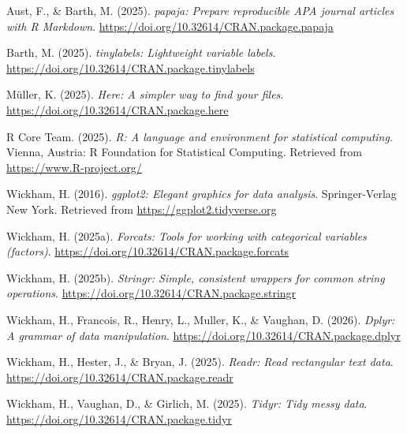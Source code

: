 \documentclass[
  english,
  man]{apa6}
\newlength{\cslhangindent}
\newenvironment{CSLReferences}[2] %
 {\begin{list}{}{%
  \setlength{\itemindent}{0pt}
  \setlength{\leftmargin}{0pt}
  \setlength{\parsep}{0pt}
  \ifodd #1
   \setlength{\leftmargin}{\cslhangindent}
   \setlength{\itemindent}{-1\cslhangindent}
  \fi
  \setlength{\itemsep}{#2\baselineskip}}}
 {\end{list}}
\begin{document}
\label{refs}
\begin{CSLReferences}{1}{0}
Aust, F., \& Barth, M. (2025). \emph{{papaja}: {Prepare} reproducible {APA} journal articles with {R Markdown}}. \url{https://doi.org/10.32614/CRAN.package.papaja}

Barth, M. (2025). \emph{{tinylabels}: Lightweight variable labels}. \url{https://doi.org/10.32614/CRAN.package.tinylabels}

Müller, K. (2025). \emph{Here: A simpler way to find your files}. \url{https://doi.org/10.32614/CRAN.package.here}

R Core Team. (2025). \emph{R: A language and environment for statistical computing}. Vienna, Austria: R Foundation for Statistical Computing. Retrieved from \url{https://www.R-project.org/}

Wickham, H. (2016). \emph{ggplot2: Elegant graphics for data analysis}. Springer-Verlag New York. Retrieved from \url{https://ggplot2.tidyverse.org}

Wickham, H. (2025a). \emph{Forcats: Tools for working with categorical variables (factors)}. \url{https://doi.org/10.32614/CRAN.package.forcats}

Wickham, H. (2025b). \emph{Stringr: Simple, consistent wrappers for common string operations}. \url{https://doi.org/10.32614/CRAN.package.stringr}

Wickham, H., Francois, R., Henry, L., Muller, K., \& Vaughan, D. (2026). \emph{Dplyr: A grammar of data manipulation}. \url{https://doi.org/10.32614/CRAN.package.dplyr}

Wickham, H., Hester, J., \& Bryan, J. (2025). \emph{Readr: Read rectangular text data}. \url{https://doi.org/10.32614/CRAN.package.readr}

Wickham, H., Vaughan, D., \& Girlich, M. (2025). \emph{Tidyr: Tidy messy data}. \url{https://doi.org/10.32614/CRAN.package.tidyr}

\end{CSLReferences}
\end{document}
